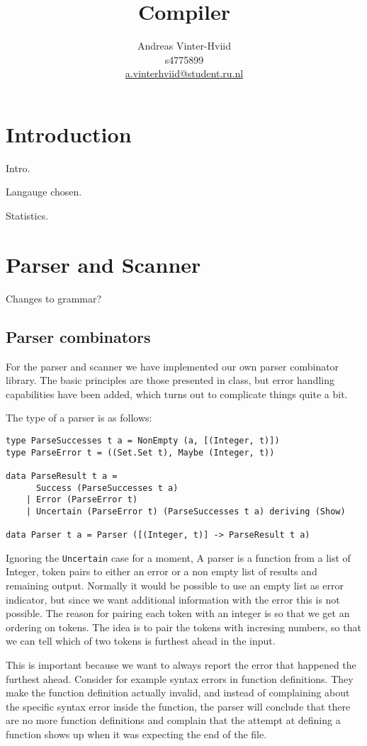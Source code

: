 \documentclass{scrartcl}
\title{Compiler}
\author{Andreas Vinter-Hviid \\ s4775899 \\ \url{a.vinterhviid@student.ru.nl}}
\begin{document}
\maketitle

\tableofcontents

\section{Introduction}
Intro.

Langauge chosen.

Statistics.
\section{Parser and Scanner}
Changes to grammar?

\subsection{Parser combinators}

For the parser and scanner we have implemented our own parser combinator
library. The basic principles are those presented in class, but error
handling capabilities have been added, which turns out to complicate
things quite a bit.

The type of a parser is as follows:
\begin{lstlisting}
type ParseSuccesses t a = NonEmpty (a, [(Integer, t)])
type ParseError t = ((Set.Set t), Maybe (Integer, t))

data ParseResult t a = 
      Success (ParseSuccesses t a)
    | Error (ParseError t)
    | Uncertain (ParseError t) (ParseSuccesses t a) deriving (Show)

data Parser t a = Parser ([(Integer, t)] -> ParseResult t a)
\end{lstlisting}
Ignoring the \lstinline{Uncertain} case for a moment,
A parser is a function from a list of Integer, token pairs to either
an error or a non empty list of results and remaining output.
Normally it would be possible to use an empty list as error indicator,
but since we want additional information with the error this is not
possible. The reason for pairing each token with an integer is so that
we get an ordering on tokens. The idea is to pair the tokens with 
incresing numbers, so that we can tell which of two tokens is furthest
ahead in the input.

This is important because we want to always report the error that
happened the furthest ahead. Consider for example 
syntax errors in function definitions.
They make the function definition actually invalid,
and instead of complaining about the specific syntax error inside the
function, the parser will conclude that there are no more function
definitions and complain that the attempt at defining a function
shows up when it was expecting the end of the file.
\end{document}
